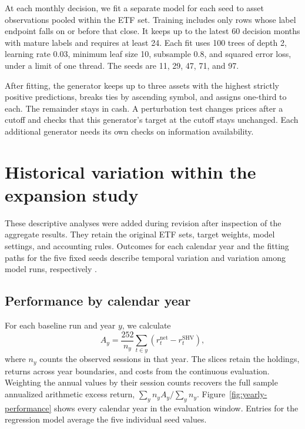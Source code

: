 \documentclass{article}
\begin{document}
At each monthly decision, we fit a separate model for each seed to asset observations pooled within the ETF set. Training includes only rows whose label endpoint falls on or before that close. It keeps up to the latest 60 decision months with mature labels and requires at least 24. Each fit uses 100 trees of depth 2, learning rate 0.03, minimum leaf size 10, subsample 0.8, and squared error loss, under a limit of one thread. The seeds are 11, 29, 47, 71, and 97.

After fitting, the generator keeps up to three assets with the highest strictly positive predictions, breaks ties by ascending symbol, and assigns one-third to each. The remainder stays in cash. A perturbation test changes prices after a cutoff and checks that this generator's target at the cutoff stays unchanged. Each additional generator needs its own checks on information availability.

\clearpage
\section{Historical variation within the expansion study}
\label{app:expansion-followups}

These descriptive analyses were added during revision after inspection of the aggregate results. They retain the original ETF sets, target weights, model settings, and accounting rules. Outcomes for each calendar year and the fitting paths for the five fixed seeds describe temporal variation and variation among model runs, respectively \citep{bouthillier2021variance}.

\subsection{Performance by calendar year}

For each baseline run and year $y$, we calculate
\begin{equation}
  A_y = \frac{252}{n_y}\sum_{t\in y}
  \left(r_t^{\mathrm{net}}-r_t^{\mathrm{SHV}}\right),
  \label{eq:annual-excess}
\end{equation}
where $n_y$ counts the observed sessions in that year. The slices retain the
holdings, returns across year boundaries, and costs from the continuous evaluation.
Weighting the annual values by their session counts recovers the full sample
annualized arithmetic excess return, $\sum_y n_y A_y / \sum_y n_y$. Figure~\ref{fig:yearly-performance} shows every calendar year
in the evaluation window. Entries for the regression model average the five individual seed values.
\end{document}

